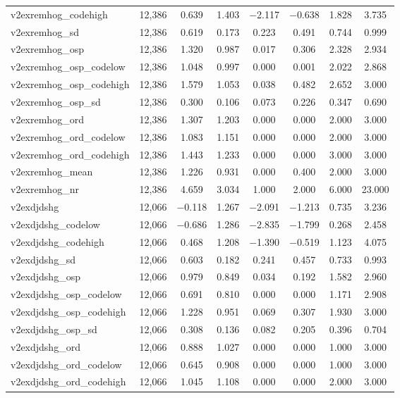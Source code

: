 \begin{table}[!htbp]
\begin{tabular}{@{\extracolsep{5pt}}lccccccc}
v2exremhog\_codehigh & 12,386 & 0.639 & 1.403 & $-$2.117 & $-$0.638 & 1.828 & 3.735 \\ 
v2exremhog\_sd & 12,386 & 0.619 & 0.173 & 0.223 & 0.491 & 0.744 & 0.999 \\ 
v2exremhog\_osp & 12,386 & 1.320 & 0.987 & 0.017 & 0.306 & 2.328 & 2.934 \\ 
v2exremhog\_osp\_codelow & 12,386 & 1.048 & 0.997 & 0.000 & 0.001 & 2.022 & 2.868 \\ 
v2exremhog\_osp\_codehigh & 12,386 & 1.579 & 1.053 & 0.038 & 0.482 & 2.652 & 3.000 \\ 
v2exremhog\_osp\_sd & 12,386 & 0.300 & 0.106 & 0.073 & 0.226 & 0.347 & 0.690 \\ 
v2exremhog\_ord & 12,386 & 1.307 & 1.203 & 0.000 & 0.000 & 2.000 & 3.000 \\ 
v2exremhog\_ord\_codelow & 12,386 & 1.083 & 1.151 & 0.000 & 0.000 & 2.000 & 3.000 \\ 
v2exremhog\_ord\_codehigh & 12,386 & 1.443 & 1.233 & 0.000 & 0.000 & 3.000 & 3.000 \\ 
v2exremhog\_mean & 12,386 & 1.226 & 0.931 & 0.000 & 0.400 & 2.000 & 3.000 \\ 
v2exremhog\_nr & 12,386 & 4.659 & 3.034 & 1.000 & 2.000 & 6.000 & 23.000 \\ 
v2exdjdshg & 12,066 & $-$0.118 & 1.267 & $-$2.091 & $-$1.213 & 0.735 & 3.236 \\ 
v2exdjdshg\_codelow & 12,066 & $-$0.686 & 1.286 & $-$2.835 & $-$1.799 & 0.268 & 2.458 \\ 
v2exdjdshg\_codehigh & 12,066 & 0.468 & 1.208 & $-$1.390 & $-$0.519 & 1.123 & 4.075 \\ 
v2exdjdshg\_sd & 12,066 & 0.603 & 0.182 & 0.241 & 0.457 & 0.733 & 0.993 \\ 
v2exdjdshg\_osp & 12,066 & 0.979 & 0.849 & 0.034 & 0.192 & 1.582 & 2.960 \\ 
v2exdjdshg\_osp\_codelow & 12,066 & 0.691 & 0.810 & 0.000 & 0.000 & 1.171 & 2.908 \\ 
v2exdjdshg\_osp\_codehigh & 12,066 & 1.228 & 0.951 & 0.069 & 0.307 & 1.930 & 3.000 \\ 
v2exdjdshg\_osp\_sd & 12,066 & 0.308 & 0.136 & 0.082 & 0.205 & 0.396 & 0.704 \\ 
v2exdjdshg\_ord & 12,066 & 0.888 & 1.027 & 0.000 & 0.000 & 1.000 & 3.000 \\ 
v2exdjdshg\_ord\_codelow & 12,066 & 0.645 & 0.908 & 0.000 & 0.000 & 1.000 & 3.000 \\ 
v2exdjdshg\_ord\_codehigh & 12,066 & 1.045 & 1.108 & 0.000 & 0.000 & 2.000 & 3.000 \\ 

\end{tabular}
\end{table}
